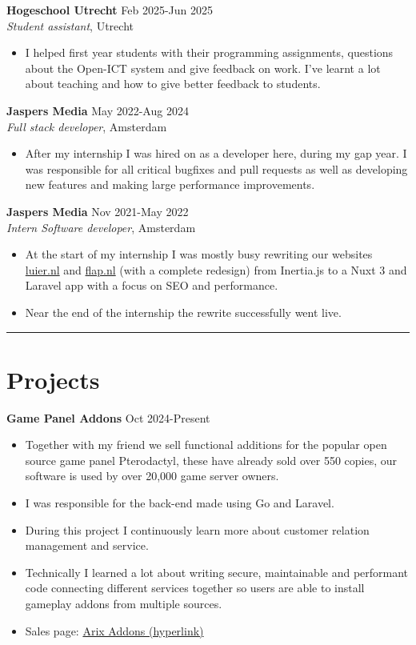 \documentclass{article}
\begin{document}
\textbf{Hogeschool Utrecht} \hfill Feb 2025-Jun 2025 \\
\textit{Student assistant}, Utrecht
\begin{itemize}[noitemsep]
    \item I helped first year students with their programming assignments, questions about the Open-ICT system and give feedback on work.
     I've learnt a lot about teaching and how to give better feedback to students.
\end{itemize}
\textbf{Jaspers Media} \hfill May 2022-Aug 2024 \\
\textit{Full stack developer}, Amsterdam
\begin{itemize}[noitemsep]
    \item After my internship I was hired on as a developer here, during my gap year.
        I was responsible for all critical bugfixes and pull requests as well as developing new features and making large performance improvements.
\end{itemize}
\textbf{Jaspers Media} \hfill Nov 2021-May 2022 \\
\textit{Intern Software developer}, Amsterdam
\begin{itemize}[noitemsep]
    \item At the start of my internship I was mostly busy rewriting our websites \href{https://luier.nl}{luier.nl} and \href{https://flap.nl}{flap.nl} (with a complete redesign) from Inertia.js to a Nuxt 3 and Laravel app with a focus on SEO and performance.
    \item Near the end of the internship the rewrite successfully went live.
\end{itemize}

\noindent\rule{\linewidth}{0.4pt}
\section*{Projects}
\textbf{Game Panel Addons} \hfill Oct 2024-Present \\
\begin{itemize}[noitemsep]
    \item Together with my friend we sell functional additions for the popular open source game panel Pterodactyl, these have already sold over 550 copies, our software is used by over 20,000 game server owners.
    \item I was responsible for the back-end made using Go and Laravel.
    \item During this project I continuously learn more about customer relation management and service.
    \item Technically I learned a lot about writing secure, maintainable and performant code connecting different services together so users are able to install gameplay addons from multiple sources.
    \item Sales page: \href{https://builtbybit.com/resources/addon-pack-arix-pterodactyl.62333/}{Arix Addons (hyperlink)}
\end{itemize}
\end{document}

